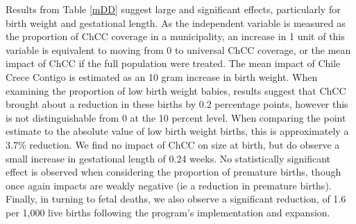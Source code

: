 \documentclass[12pt]{article}
\begin{document}
\begin{spacing}{1.4}
Results from Table \ref{mDD} suggest large and significant effects,
particularly for birth weight and gestational length.  As the
independent variable is measured as the proportion of ChCC coverage
in a municipality, an increase in 1 unit of this variable is equivalent
to moving from 0 to universal ChCC coverage, or the mean impact of
ChCC if the full population were treated. The mean impact of Chile
Crece Contigo is estimated as an 10 gram increase in birth weight.  When
examining the proportion of low birth weight babies, results suggest
that ChCC brought about a reduction in these births by 0.2 percentage
points, however this is not distinguishable from 0 at the 10 percent
level.  When comparing the point estimate to the absolute value of low
birth weight births, this is approximately a 3.7\% reduction. We find no
impact of ChCC on size at birth, but do observe a small increase in
gestational length of 0.24 weeks. No statistically significant effect
is observed when considering the proportion of premature births, though
once again impacts are weakly negative (ie a reduction in premature
births).  Finally, in turning to fetal deaths, we also observe a
significant reduction, of 1.6 per 1,000 live births following the
program's implementation and expansion.




\end{spacing}
\end{document}
